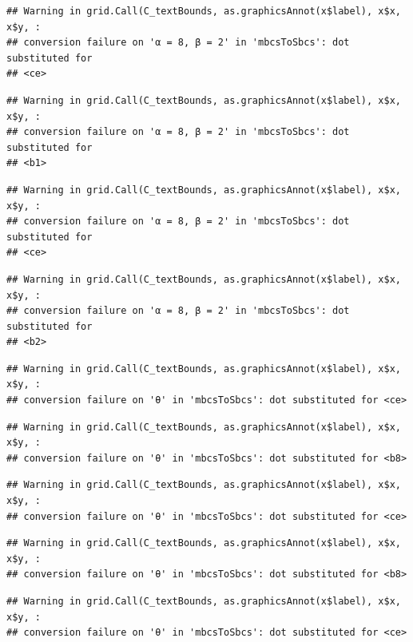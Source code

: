 \documentclass[]{book}
\theoremstyle{definition}
\theoremstyle{definition}
\theoremstyle{definition}
\theoremstyle{remark}
\begin{document}
\begin{verbatim}
## Warning in grid.Call(C_textBounds, as.graphicsAnnot(x$label), x$x, x$y, :
## conversion failure on 'α = 8, β = 2' in 'mbcsToSbcs': dot substituted for
## <ce>
\end{verbatim}

\begin{verbatim}
## Warning in grid.Call(C_textBounds, as.graphicsAnnot(x$label), x$x, x$y, :
## conversion failure on 'α = 8, β = 2' in 'mbcsToSbcs': dot substituted for
## <b1>
\end{verbatim}

\begin{verbatim}
## Warning in grid.Call(C_textBounds, as.graphicsAnnot(x$label), x$x, x$y, :
## conversion failure on 'α = 8, β = 2' in 'mbcsToSbcs': dot substituted for
## <ce>
\end{verbatim}

\begin{verbatim}
## Warning in grid.Call(C_textBounds, as.graphicsAnnot(x$label), x$x, x$y, :
## conversion failure on 'α = 8, β = 2' in 'mbcsToSbcs': dot substituted for
## <b2>
\end{verbatim}

\begin{verbatim}
## Warning in grid.Call(C_textBounds, as.graphicsAnnot(x$label), x$x, x$y, :
## conversion failure on 'θ' in 'mbcsToSbcs': dot substituted for <ce>
\end{verbatim}

\begin{verbatim}
## Warning in grid.Call(C_textBounds, as.graphicsAnnot(x$label), x$x, x$y, :
## conversion failure on 'θ' in 'mbcsToSbcs': dot substituted for <b8>
\end{verbatim}

\begin{verbatim}
## Warning in grid.Call(C_textBounds, as.graphicsAnnot(x$label), x$x, x$y, :
## conversion failure on 'θ' in 'mbcsToSbcs': dot substituted for <ce>
\end{verbatim}

\begin{verbatim}
## Warning in grid.Call(C_textBounds, as.graphicsAnnot(x$label), x$x, x$y, :
## conversion failure on 'θ' in 'mbcsToSbcs': dot substituted for <b8>
\end{verbatim}

\begin{verbatim}
## Warning in grid.Call(C_textBounds, as.graphicsAnnot(x$label), x$x, x$y, :
## conversion failure on 'θ' in 'mbcsToSbcs': dot substituted for <ce>
\end{verbatim}
\end{document}
